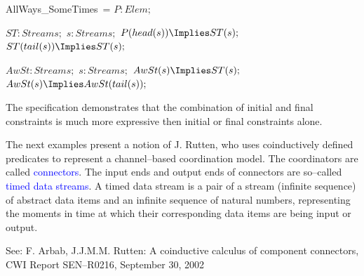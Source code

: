 \documentclass[landscape, autoslides, light]{mmiss}
\newcommand{\ns}{\normalsize}
\begin{document}
\begin{Package}[Label={FSDPT}, Title={Formal Specification of Data and Process Types}, ShortTitle={FSDPT}, Authors={Horst Reichel}, Date={February 2003}, LevelOfDetail=Lecture, Language=en-GB]
\begin{Section}[Title={Final Coalgebras as Process Types}, Label={section4}]
\begin{Section}[Title={Behavioural Subtypes}, Label={section4_4}]
\begin{Paragraph}[Title={allways sometimes}, Label=Paragraph133]
\end{Paragraph}
\begin{Paragraph}[Label=Paragraph134]
\small
\begin{SpecDefn}{AllWays\_SomeTimes}~=  \I \Then
\I\Pred \( P : Elem; \) \item[\Cofree~\Group] \item[\Then]
\begin{Items}
 \item[\Free~\Group]
\begin{Items}
\I\Pred \( ST : Streams;\) \I\Vars \( s : Streams; \) \I\Axioms \(
P(head(s)) \Implies ST(s);\)
\\ \(ST(tail(s)) \Implies ST(s);\)
  ~\EndGroup \end{Items}
\I\Pred \( AwSt : Streams;\) \I\Vars \( s : Streams; \) \I\Axioms
\( AwSt(s) \Implies ST(s);\)
\\ \(AwSt(s) \Implies AwSt(tail(s));\)
  ~\EndGroup \end{Items} \item[\End]
\end{SpecDefn}

\end{Paragraph}
\begin{Paragraph}[Title={allways sometimes}, Label=Paragraph135]

\ns The specification  demonstrates
that the combination of initial and final constraints is much more
expressive then initial or final constraints alone.

\end{Paragraph}
\begin{Paragraph}[Title={Component Connectors}, Label=Paragraph136]
\small The next examples present a notion of J. Rutten, who uses
coinductively defined predicates to represent a channel--based
coordination model. The coordinators are called
\textcolor{blue}{connectors}. The input ends and output ends of
connectors are so--called \textcolor{blue}{timed data streams}. A
timed data stream is a pair of a stream (infinite sequence) of
abstract data items and an infinite sequence of natural numbers,
representing the moments in time at which their corresponding data
items are being input or output.\pause

See: F. Arbab, J.J.M.M. Rutten: A coinductive calculus of
component connectors, CWI Report SEN--R0216, September 30, 2002



\end{Paragraph}
\end{Section}
\end{Section}
\end{Package}
\end{document}
